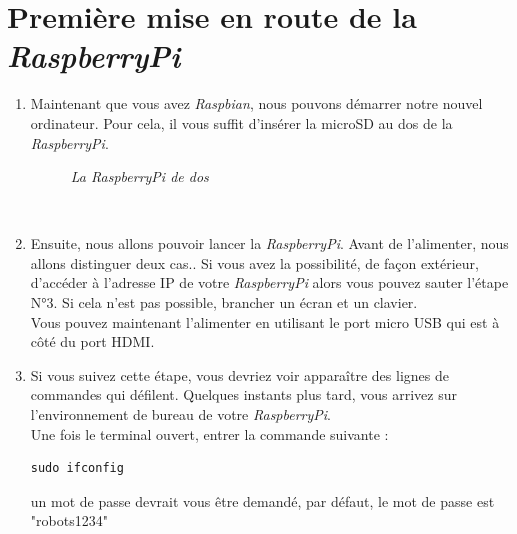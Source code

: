 \section{Première mise en route de la \textit{RaspberryPi}}

\begin{enumerate}

	\item Maintenant que vous avez \textit{Raspbian}, nous pouvons démarrer notre nouvel ordinateur.
Pour cela, il vous suffit d'insérer la microSD au dos de la \textit{RaspberryPi}.\\
\begin{figure}[H]
\begin{center}
\end{center}
	\caption{ \textit{La \textit{RaspberryPi} de dos}}
\end{figure}\\

	\item Ensuite, nous allons pouvoir lancer la \textit{RaspberryPi}. Avant de l'alimenter, nous allons distinguer deux cas.. Si vous avez la possibilité, de façon extérieur, d'accéder à l'adresse IP de votre \textit{RaspberryPi} alors vous pouvez sauter l'étape N°3. Si cela n'est pas possible, brancher un écran et un clavier.\\
	Vous pouvez maintenant l'alimenter en utilisant le port micro USB qui est à côté du port HDMI.\\
	
	\item Si vous suivez cette étape, vous devriez voir apparaître des lignes de commandes qui défilent. Quelques instants plus tard, vous arrivez sur l'environnement de bureau de votre \textit{RaspberryPi}.\\
Une fois le terminal ouvert, entrer la commande suivante :\\
\begin{lstlisting}[style=MyBashStyle]
	sudo ifconfig
\end{lstlisting}
un mot de passe devrait vous être demandé, par défaut, le mot de passe est "robots1234"


\end{enumerate}
